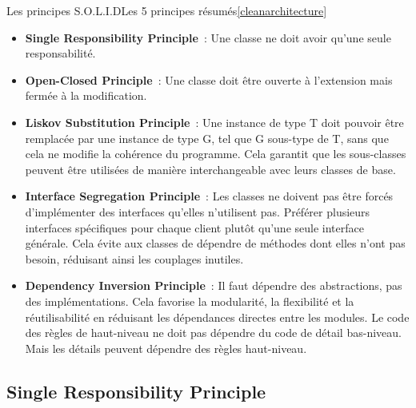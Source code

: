 \documentclass{beamer}
\begin{document}
    \begin{frame}{Les principes S.O.L.I.D}{Les 5 principes résumés\cref{cleanarchitecture}}
        \begin{footnotesize}
            \begin{itemize}
                \item \textbf{Single Responsibility Principle}~: Une classe ne doit avoir qu'une seule responsabilité.
                \item \textbf{Open-Closed Principle}~: Une classe doit être ouverte à l'extension mais fermée à la modification.
                \item \textbf{Liskov Substitution Principle}~: Une instance de type T doit pouvoir être remplacée par une instance de type G, tel que G sous-type de T, sans que cela ne modifie la cohérence du programme.
                Cela garantit que les sous-classes peuvent être utilisées de manière interchangeable avec leurs classes de base.
                \item \textbf{Interface Segregation Principle}~: Les classes ne doivent pas être forcés d'implémenter des interfaces qu'elles n'utilisent pas.
                Préférer plusieurs interfaces spécifiques pour chaque client plutôt qu'une seule interface générale.
                Cela évite aux classes de dépendre de méthodes dont elles n'ont pas besoin, réduisant ainsi les couplages inutiles.
                \item \textbf{Dependency Inversion Principle}~: Il faut dépendre des abstractions, pas des implémentations.
                Cela favorise la modularité, la flexibilité et la réutilisabilité en réduisant les dépendances directes entre les modules.
                Le code des règles de haut-niveau ne doit pas dépendre du code de détail bas-niveau.
                Mais les détails peuvent dépendre des règles haut-niveau.
            \end{itemize}
        \end{footnotesize}
    \end{frame}

    \subsection{Single Responsibility Principle}\label{subsec:mid-level-s}
\end{document}
